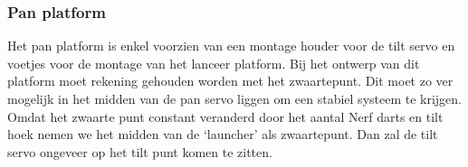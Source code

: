 \subsubsection{Pan platform}

Het pan platform is enkel voorzien van een montage houder voor de tilt servo en
voetjes voor de montage van het lanceer platform.
Bij het ontwerp van dit platform moet rekening gehouden worden met het zwaartepunt. Dit
moet zo ver mogelijk in het midden van de pan servo liggen om een stabiel systeem te krijgen. Omdat
het zwaarte punt constant veranderd door het aantal Nerf darts en tilt hoek nemen we het
midden van de ‘launcher’ als zwaartepunt. Dan zal de tilt servo ongeveer op het tilt punt komen te
zitten.
